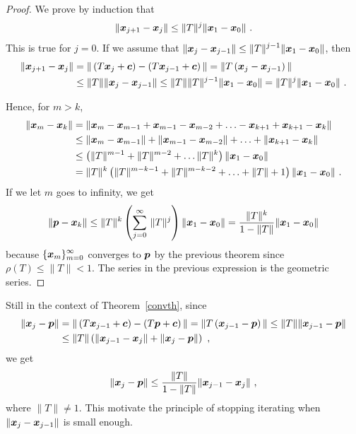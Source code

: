 \begin{proof}
We prove by induction that
\[
\|\bm{x}_{j+1} -\bm{x}_{j}\| \leq
\|T\|^j \|\bm{x}_{1} - \bm{x}_{0}\| \ .
\]
This is true for $j=0$.  If we assume that
$\displaystyle \|\bm{x}_{j} -\bm{x}_{j-1}\| \leq
\|T\|^{j-1} \|\bm{x}_{1} - \bm{x}_{0}\|$, then
\[
\begin{split}
\|\bm{x}_{j+1} -\bm{x}_{j}\|
&= \| \left(T\bm{x}_{j} + \bm{c} \right)
-\left(T\bm{x}_{j-1}+\bm{c}\right) \|
= \| T \left(\bm{x}_{j} - \bm{x}_{j-1} \right) \| \\
& \leq \|T\| \|\bm{x}_{j} - \bm{x}_{j-1}\|
\leq \|T\| \|T\|^{j-1} \|\bm{x}_{1} - \bm{x}_{0}\|
= \|T\|^{j} \|\bm{x}_{1} - \bm{x}_{0}\| \ .
\end{split}
\]

Hence, for $m > k$,
\[
\begin{split}
\|\bm{x}_{m} - \bm{x}_{k}\|
&= \|\bm{x}_{m} - \bm{x}_{m-1} + \bm{x}_{m-1} - \bm{x}_{m-2}
+ \ldots - \bm{x}_{k+1} + \bm{x}_{k+1} - \bm{x}_{k} \| \\
&\leq \|\bm{x}_{m} - \bm{x}_{m-1}\| + \|\bm{x}_{m-1} - \bm{x}_{m-2}\|
+ \ldots + \|\bm{x}_{k+1} - \bm{x}_{k}\| \\
&\leq \left(\|T\|^{m-1} + \|T\|^{m-2} + \ldots \|T\|^k\right)\|\bm{x}_{1} -
\bm{x}_{0}\|\\
&= \|T\|^k\left(\|T\|^{m-k-1} + \|T\|^{m-k-2} + \ldots + \|T\| +1\right)
\|\bm{x}_{1} - \bm{x}_{0}\| \ .
\end{split}
\]
If we let $m$ goes to infinity, we get
\[
\|\bm{p} - \bm{x}_{k}\| \leq \|T\|^k\left(
\sum_{j=0}^\infty \, \|T\|^j\right)\|\bm{x}_{1} - \bm{x}_{0}\| = 
\frac{\|T\|^k}{1-\|T\|} \|\bm{x}_{1} - \bm{x}_{0}\|
\]
because $\displaystyle \{\bm{x}_{m}\}_{m=0}^\infty$ converges to
$\bm{p}$ by the previous theorem since $\rho(T) \leq \|T\| <1$.  The
series in the previous expression is the geometric series.
\end{proof}

\begin{rmk}
Still in the context of Theorem~\ref{convth}, since
\[
\begin{split}
\|\bm{x}_{j} - \bm{p} \|
&= \| \left(T\bm{x}_{j-1} + \bm{c} \right) - \left(T\bm{p}+\bm{c}\right) \|
= \| T \left(\bm{x}_{j-1} - \bm{p}\right) \|
\leq \|T\| \|\bm{x}_{j-1} - \bm{p} \| \\
&\leq \|T\| \left( \|\bm{x}_{j-1} - \bm{x}_{j}\|
+ \|\bm{x}_{j} - \bm{p} \| \right) \ ,
\end{split}
\]
we get
\[
\| \bm{x}_{j} - \bm{p} \| \leq
\frac{\|T\|}{1-\|T\|} \|\bm{x}_{j-1}-\bm{x}_j\| \ ,
\]
where $\|T\|\neq 1$.  This motivate the principle of stopping
iterating when $\|\bm{x}_{j} - \bm{x}_{j-1}\|$ is small enough.
\end{rmk}


